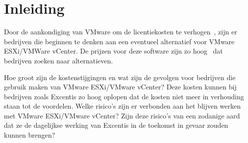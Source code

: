 


% 

\section{Inleiding}%
\label{sec:inleiding}

Door de aankondiging van VMware om de licentiekosten te verhogen~\autocite{device42_2024}, zijn er bedrijven die beginnen te denken aan een eventueel alternatief voor VMware ESXi/VMWare vCenter.
De prijzen voor deze software zijn zo hoog~\autocite{Hale2024} dat bedrijven zoeken naar alternatieven.

Hoe groot zijn de kostenstijgingen en wat zijn de gevolgen voor bedrijven die gebruik maken van VMware ESXi/VMware vCenter?
Deze kosten kunnen bij bedrijven zoals Excentis zo hoog oplopen dat de kosten niet meer in verhouding staan tot de voordelen.
Welke risico's zijn er verbonden aan het blijven werken met VMware ESXi/VMware vCenter?
Zijn deze risico’s van een zodanige aard dat ze de dagelijkse werking van Excentis in de toekomst in gevaar zouden kunnen brengen?

